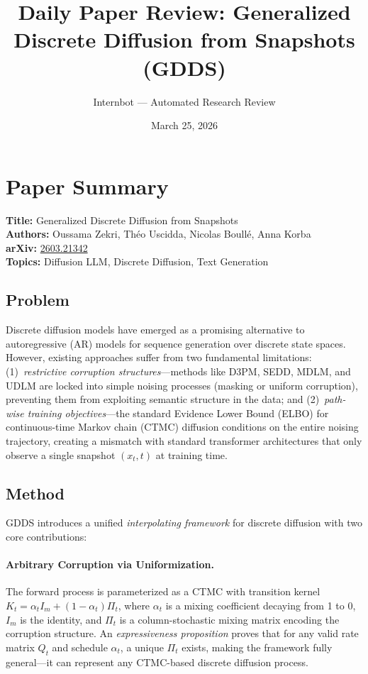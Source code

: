\documentclass[11pt]{article}
\title{Daily Paper Review: Generalized Discrete Diffusion from Snapshots (GDDS)}
\author{Internbot --- Automated Research Review}
\date{March 25, 2026}
\begin{document}
\maketitle

\section{Paper Summary}

\textbf{Title:} Generalized Discrete Diffusion from Snapshots \\
\textbf{Authors:} Oussama Zekri, Th\'{e}o Uscidda, Nicolas Boull\'{e}, Anna Korba \\
\textbf{arXiv:} \href{https://arxiv.org/abs/2603.21342}{2603.21342} \\
\textbf{Topics:} Diffusion LLM, Discrete Diffusion, Text Generation

\subsection{Problem}

Discrete diffusion models have emerged as a promising alternative to autoregressive (AR) models for sequence generation over discrete state spaces. However, existing approaches suffer from two fundamental limitations: (1)~\textit{restrictive corruption structures}---methods like D3PM, SEDD, MDLM, and UDLM are locked into simple noising processes (masking or uniform corruption), preventing them from exploiting semantic structure in the data; and (2)~\textit{path-wise training objectives}---the standard Evidence Lower Bound (ELBO) for continuous-time Markov chain (CTMC) diffusion conditions on the entire noising trajectory, creating a mismatch with standard transformer architectures that only observe a single snapshot $(x_t, t)$ at training time.

\subsection{Method}

GDDS introduces a unified \textit{interpolating framework} for discrete diffusion with two core contributions:

\paragraph{Arbitrary Corruption via Uniformization.}
The forward process is parameterized as a CTMC with transition kernel $K_t = \alpha_t I_m + (1 - \alpha_t) \Pi_t$, where $\alpha_t$ is a mixing coefficient decaying from 1 to 0, $I_m$ is the identity, and $\Pi_t$ is a column-stochastic mixing matrix encoding the corruption structure. An \textit{expressiveness proposition} proves that for any valid rate matrix $Q_t$ and schedule $\alpha_t$, a unique $\Pi_t$ exists, making the framework fully general---it can represent any CTMC-based discrete diffusion process.
\end{document}
